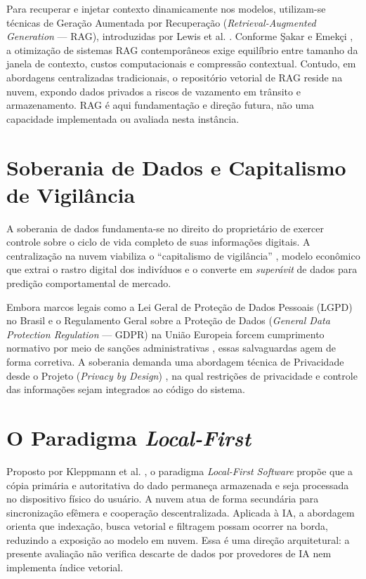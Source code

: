 Para recuperar e injetar contexto dinamicamente nos modelos, utilizam-se técnicas de Geração Aumentada por Recuperação (\textit{Retrieval-Augmented Generation} --- RAG), introduzidas por Lewis et al. \cite{lewis2020}. Conforme Şakar e Emekçi \cite{sakar2024}, a otimização de sistemas RAG contemporâneos exige equilíbrio entre tamanho da janela de contexto, custos computacionais e compressão contextual. Contudo, em abordagens centralizadas tradicionais, o repositório vetorial de RAG reside na nuvem, expondo dados privados a riscos de vazamento em trânsito e armazenamento. RAG é aqui fundamentação e direção futura, não uma capacidade implementada ou avaliada nesta instância.

\section{Soberania de Dados e Capitalismo de Vigilância}
A soberania de dados fundamenta-se no direito do proprietário de exercer controle sobre o ciclo de vida completo de suas informações digitais. A centralização na nuvem viabiliza o ``capitalismo de vigilância'' \cite{zuboff2019}, modelo econômico que extrai o rastro digital dos indivíduos e o converte em \textit{superávit} de dados para predição comportamental de mercado.

Embora marcos legais como a Lei Geral de Proteção de Dados Pessoais (LGPD) no Brasil e o Regulamento Geral sobre a Proteção de Dados (\textit{General Data Protection Regulation} --- GDPR) na União Europeia forcem cumprimento normativo por meio de sanções administrativas \cite{lorenzon2021}, essas salvaguardas agem de forma corretiva. A soberania demanda uma abordagem técnica de Privacidade desde o Projeto (\textit{Privacy by Design}) \cite{cavoukian2011}, na qual restrições de privacidade e controle das informações sejam integrados ao código do sistema.

\section{O Paradigma \textit{Local-First}}
Proposto por Kleppmann et al. \cite{kleppmann2019}, o paradigma \textit{Local-First Software} propõe que a cópia primária e autoritativa do dado permaneça armazenada e seja processada no dispositivo físico do usuário. A nuvem atua de forma secundária para sincronização efêmera e cooperação descentralizada. Aplicada à IA, a abordagem orienta que indexação, busca vetorial e filtragem possam ocorrer na borda, reduzindo a exposição ao modelo em nuvem. Essa é uma direção arquitetural: a presente avaliação não verifica descarte de dados por provedores de IA nem implementa índice vetorial.

